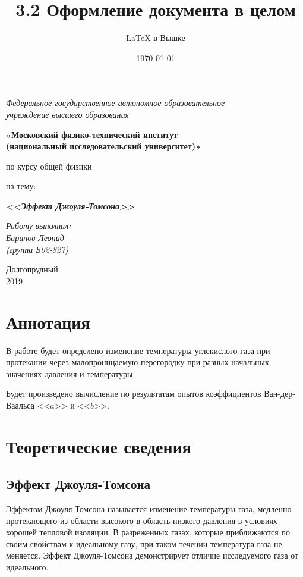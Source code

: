 \documentclass[a4paper,12pt]{article}
\author{\LaTeX{} в Вышке}
\title{3.2 Оформление документа в целом}
\date{\today}
\theoremstyle{plain} %
\theoremstyle{definition} %
\theoremstyle{remark} %
\begin{document}
	\thispagestyle{empty}
	\begin{center}
		\textit{Федеральное государственное автономное образовательное\\ учреждение высшего образования }
		\vspace{0.5ex}
		
		\textbf{«Московский физико-технический институт\\ (национальный исследовательский университет)»}
	\end{center}
	\vspace{10ex}
	\begin{center}
		\vspace{13ex}
		\vspace{1ex}
		
		по курсу общей физики
		
		
		на тему:
		
		\textbf{\textit{<<Эффект Джоуля-Томсона>>}}
		\vspace{30ex}
		\begin{flushright}
			\noindent
			\textit{Работу выполнил:}
			\\
			\textit{Баринов Леонид \\(группа Б02-827)}
		\end{flushright}
		\vfill
		Долгопрудный \\2019
	\end{center}
	\newpage
	\setcounter{page}{1}
	\fancyhead[R]{\nouppercase{\leftmark}}
	\section{Аннотация}
	В работе будет определено изменение температуры углекислого газа при протекании через малопроницаемую перегородку при разных начальных значениях давления и температуры
	
	Будет произведено вычисление по результатам опытов коэффициентов Ван-дер-Ваальса <<$a$>> и <<$b$>>.
	\section {Теоретические сведения}
	\subsection{Эффект Джоуля-Томсона}
	Эффектом Джоуля-Томсона называется изменение температуры газа, медленно протекающего из области высокого в область низкого давления в условиях хорошей тепловой изоляции. В разреженных газах, которые приближаются по своим свойствам к идеальному газу, при таком течении температура газа не меняется. Эффект Джоуля-Томсона демонстрирует отличие исследуемого газа от идеального.
\end{document}
